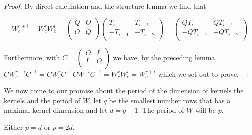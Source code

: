 \begin{proof}
  By direct calculation and the structure lemma we find that

  \[
  W_{c}^{r+i}
  =
  W_{c}^{r}W_{c}^{i}
  =
  \left(
  \begin{array}{cc}
    Q & O \\
    O & Q \\
  \end{array}
  \right)
  \left(
  \begin{array}{cc}
     T_{i} &  T_{i-1}  \\
    -T_{i-1} & -T_{i-2} \\
  \end{array}
  \right)
  =
  \left(
  \begin{array}{cc}
     QT_{i} &  QT_{i-1}  \\
    -QT_{i-1} & -QT_{i-2} \\
  \end{array}
  \right)
  \]

  Furthermore, with $C=\left(\begin{smallmatrix} O & I \\ I & O \\\end{smallmatrix}\right)$
  we have, by the preceding lemma,
  $CW_{c}^{r-i}C^{-1}=CW_{c}^{r}C^{-1}CW^{-i}C^{-1}=W_{c}^{r}W_{c}^{i}=W_{c}^{r+i}$
  which we set out to prove.
\end{proof}

We now come to our promise about the period of the dimension of kernels the
kernels and the period of $W$. let $q$ be the smallest number rows that has a
maximal kernel dimension and let $d = q+1$. The period of $W$ will be $p$.

\begin{lemma}
  Either $p=d$ or $p=2d$.
\end{lemma}

